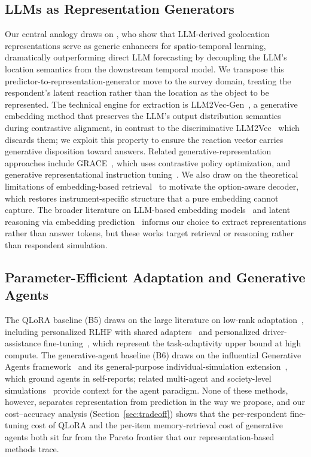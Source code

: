 \subsection{LLMs as Representation Generators}
Our central analogy draws on \citet{he2025geolocation}, who show that LLM-derived geolocation representations serve as generic enhancers for spatio-temporal learning, dramatically outperforming direct LLM forecasting by decoupling the LLM's location semantics from the downstream temporal model. We transpose this predictor-to-representation-generator move to the survey domain, treating the respondent's latent reaction rather than the location as the object to be represented. The technical engine for extraction is LLM2Vec-Gen~\citep{behnamghader2026llmvecgen}, a generative embedding method that preserves the LLM's output distribution semantics during contrastive alignment, in contrast to the discriminative LLM2Vec~\citep{behnamghader2024llmvec} which discards them; we exploit this property to ensure the reaction vector carries generative disposition toward answers. Related generative-representation approaches include GRACE~\citep{sun2025grace}, which uses contrastive policy optimization, and generative representational instruction tuning~\citep{muennighoff2024generative}. We also draw on the theoretical limitations of embedding-based retrieval~\citep{weller2025theoretical} to motivate the option-aware decoder, which restores instrument-specific structure that a pure embedding cannot capture. The broader literature on LLM-based embedding models~\citep{lee2024nvembed,wang2024improving,wang2024multilingual,enevoldsen2025mmteb} and latent reasoning via embedding prediction~\citep{hwang2025latent} informs our choice to extract representations rather than answer tokens, but these works target retrieval or reasoning rather than respondent simulation.

\subsection{Parameter-Efficient Adaptation and Generative Agents}
The QLoRA baseline (B5) draws on the large literature on low-rank adaptation~\citep{mao2024survey}, including personalized RLHF with shared adapters~\citep{liu2025shared} and personalized driver-assistance fine-tuning~\citep{song2025enhancing}, which represent the task-adaptivity upper bound at high compute. The generative-agent baseline (B6) draws on the influential Generative Agents framework~\citep{park2023generative} and its general-purpose individual-simulation extension~\citep{park2024agents}, which ground agents in self-reports; related multi-agent and society-level simulations~\citep{gao2024large,hou2025society} provide context for the agent paradigm. None of these methods, however, separates representation from prediction in the way we propose, and our cost--accuracy analysis (Section~\ref{sec:tradeoff}) shows that the per-respondent fine-tuning cost of QLoRA and the per-item memory-retrieval cost of generative agents both sit far from the Pareto frontier that our representation-based methods trace.

